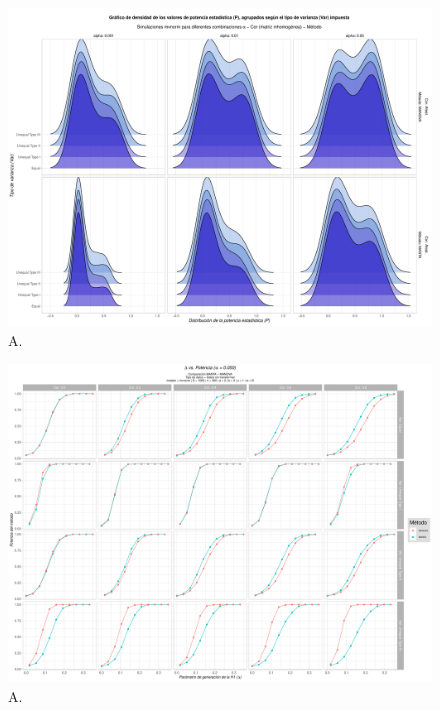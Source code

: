 \documentclass[IB,BIB]{TFUOC}%
\begin{document}
\begin{figure}[!htbp]
\hspace*{-2.1cm} %
    \centering
    \includegraphics[scale=.3]{OBJ1mvnormStatsNoHomog.pdf}
    \caption{\scriptsize{A.}}
    \label{figAppend:OBJ1mvnormStatsNoHomog}
\end{figure}

\begin{figure}[!htbp]
    \centering
    \includegraphics[scale=.45]{OBJ1a005.pdf}
    \caption{\scriptsize{A.}}
    \label{figAppend:OBJ1a005}
\end{figure}
\end{document}
